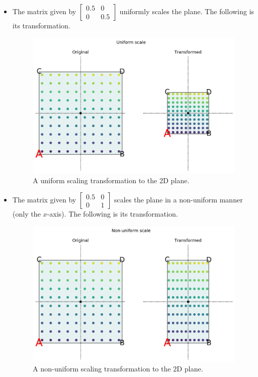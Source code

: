 \documentclass[a4paper, openany]{memoir}
\begin{document}
\begin{itemize}
        \item The matrix given by $\begin{bmatrix}
            0.5 & 0 \\
            0 & 0.5
        \end{bmatrix}$ uniformly scales the plane. The following is its transformation.
        \begin{figure}[H]
            \centering
            \includegraphics[scale=0.5]{src/3.11 UniformScale.png}
            \caption{A uniform scaling transformation to the 2D plane.}
        \end{figure}    

        \item The matrix given by $\begin{bmatrix}
            0.5 & 0 \\
            0 & 1
        \end{bmatrix}$ scales the plane in a non-uniform manner (only the $x$-axis). The following is its transformation.
        \begin{figure}[H]
            \centering
            \includegraphics[scale=0.5]{src/3.12 NonUniformScale.png}
            \caption{A non-uniform scaling transformation to the 2D plane.}
        \end{figure}    


\end{itemize}
\end{document}

